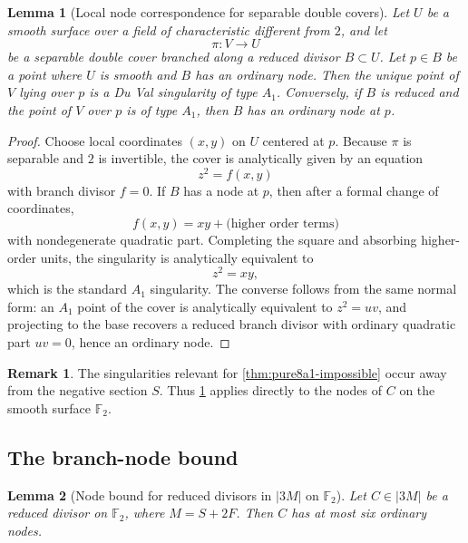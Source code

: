 \documentclass[11pt]{article}
\newtheorem{lemma}[lemma]{Lemma}
\theoremstyle{definition}
\newtheorem{remark}[remark]{Remark}
\begin{document}
\begin{lemma}[Local node correspondence for separable double covers]\label{lem:node-correspondence}
Let $U$ be a smooth surface over a field of characteristic different from $2$, and let
\[
\pi\colon V\to U
\]
be a separable double cover branched along a reduced divisor $B\subset U$. Let $p\in B$ be a point where $U$ is smooth and $B$ has an ordinary node. Then the unique point of $V$ lying over $p$ is a Du Val singularity of type $A_1$. Conversely, if $B$ is reduced and the point of $V$ over $p$ is of type $A_1$, then $B$ has an ordinary node at $p$.
\end{lemma}

\begin{proof}
Choose local coordinates $(x,y)$ on $U$ centered at $p$. Because $\pi$ is separable and $2$ is invertible, the cover is analytically given by an equation
\[
z^2=f(x,y)
\]
with branch divisor $f=0$. If $B$ has a node at $p$, then after a formal change of coordinates,
\[
f(x,y)=xy+\text{(higher order terms)}
\]
with nondegenerate quadratic part. Completing the square and absorbing higher-order units, the singularity is analytically equivalent to
\[
z^2=xy,
\]
which is the standard $A_1$ singularity. The converse follows from the same normal form: an $A_1$ point of the cover is analytically equivalent to $z^2=uv$, and projecting to the base recovers a reduced branch divisor with ordinary quadratic part $uv=0$, hence an ordinary node.
\end{proof}

\begin{remark}
The singularities relevant for \cref{thm:pure8a1-impossible} occur away from the negative section $S$. Thus \cref{lem:node-correspondence} applies directly to the nodes of $C$ on the smooth surface $\mathbb F_2$.
\end{remark}

\subsection{The branch-node bound}

\begin{lemma}[Node bound for reduced divisors in $|3M|$ on $\mathbb F_2$]\label{lem:node-bound}
Let $C\in |3M|$ be a reduced divisor on $\mathbb F_2$, where $M=S+2F$. Then $C$ has at most six ordinary nodes.
\end{lemma}
\end{document}
